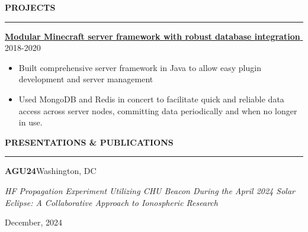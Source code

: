 \documentclass[notitlepage,10pt,a4paper]{article}
\newenvironment{resumesection}[1]{
    \header{#1}
}{}
\newcommand{\header}[1]{
    \vspace{2pt}
    \textcolor{accent1}{\Large \textbf{#1}}
    \vspace{6pt}\hrule\vspace{4pt}
}
\newcommand{\TECH}{
    \textcolor{accent3}{\small\textbf{SKILLS}}\small\,
}
\newcommand{\thingsep}{
    \vspace{4pt}
}
\newcommand{\LINK}[2]{
    \href{#1}{\textbf{#2}\,\,{\small\faExternalLink}}
}
\begin{document}
\begin{resumesection}{PROJECTS}
    \raggedright
    \textcolor{accent2}{\LINK{https://github.com/marisusis/redstone}{\large Modular Minecraft server framework with robust database integration}}  \hfill {2018-2020} \\
    {\small\begin{itemize}[noitemsep, font=\small, label={-}, leftmargin=*, topsep=0pt, partopsep=0pt]
        \item Built comprehensive server framework in Java to allow easy plugin development and server management
        \item Used MongoDB and Redis in concert to facilitate quick and reliable data access across server nodes, committing data periodically and when no longer in use.


    \end{itemize}}
    \thingsep

\end{resumesection}

\begin{resumesection}{PRESENTATIONS \& PUBLICATIONS}
    \textcolor{accent2}{\textbf{\large AGU24}}\hfill Washington, DC\\
     \begin{minipage}[t]{.8\textwidth}
        \raggedright
        \textit{\small HF Propagation Experiment Utilizing CHU Beacon During the April 2024 Solar Eclipse: A Collaborative Approach to Ionospheric Research} \\
    \end{minipage}%
    \begin{minipage}[t]{.2\textwidth}
        \raggedleft
        \hfill {\small December, 2024} \\
    \end{minipage}
    \thingsep

\end{resumesection}
\end{document}

